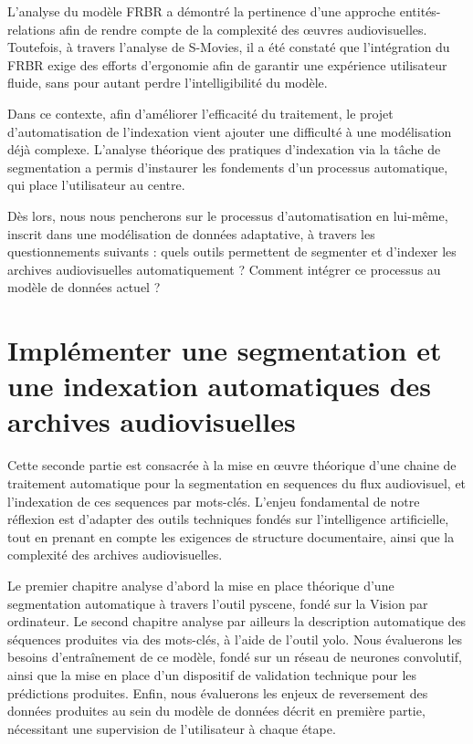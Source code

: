 \documentclass[12pt,twoside]{book}
\begin{document}
L'analyse du modèle \gls{FRBR} a démontré la pertinence d'une approche entités-relations afin de rendre compte de la complexité des œuvres audiovisuelles. Toutefois, à travers l'analyse de S-Movies, il a été constaté que l'intégration du \gls{FRBR} exige des efforts d'ergonomie afin de garantir une expérience utilisateur fluide, sans pour autant perdre l'intelligibilité du modèle.

Dans ce contexte, afin d'améliorer l'efficacité du traitement, le projet d'automatisation de l'indexation vient ajouter une difficulté à une modélisation déjà complexe. L'analyse théorique des pratiques d'indexation via la tâche de segmentation a permis d'instaurer les fondements d'un processus automatique, qui place l'utilisateur au centre.

Dès lors, nous nous pencherons sur le processus d'automatisation en lui-même, inscrit dans une modélisation de données adaptative, à travers les questionnements suivants : quels outils permettent de segmenter et d'indexer les archives audiovisuelles automatiquement ? Comment intégrer ce processus au modèle de données actuel ? 


\part{Implémenter une segmentation et une indexation automatiques des archives audiovisuelles}

Cette seconde partie est consacrée à la mise en œuvre théorique d'une chaine de traitement automatique pour la segmentation en \gls{sequence}s du flux audiovisuel, et l'indexation de ces \gls{sequence}s par mots-clés. L'enjeu fondamental de notre réflexion est d'adapter des outils techniques fondés sur l'intelligence artificielle, tout en prenant en compte les exigences de structure documentaire, ainsi que la complexité des archives audiovisuelles.

Le premier chapitre analyse d'abord la mise en place théorique d'une segmentation automatique à travers l'outil \gls{pyscene}, fondé sur la \gls{Vision par ordinateur}. 
Le second chapitre analyse par ailleurs la description automatique des séquences produites via des mots-clés, à l'aide de l'outil \gls{yolo}. Nous évaluerons les besoins d'entraînement de ce modèle, fondé sur un réseau de neurones convolutif, ainsi que la mise en place d'un dispositif de validation technique pour les prédictions produites. 
Enfin, nous évaluerons les enjeux de reversement des données produites au sein du modèle de données décrit en première partie, nécessitant une supervision de l'utilisateur à chaque étape. 
\end{document}
